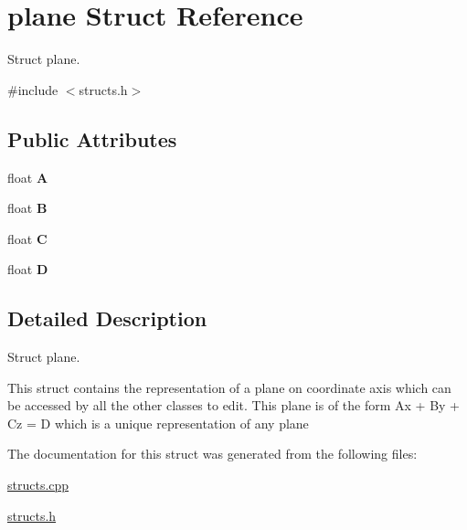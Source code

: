 \hypertarget{structplane}{}\section{plane Struct Reference}
\label{structplane}


Struct plane.  




{\ttfamily \#include $<$structs.\+h$>$}

\subsection*{Public Attributes}
\begin{DoxyCompactItemize}
\item 
float {\bfseries A}\hypertarget{structplane_a7cbe59df743ed3cf5b914b94e5d8ae52}{}\label{structplane_a7cbe59df743ed3cf5b914b94e5d8ae52}

\item 
float {\bfseries B}\hypertarget{structplane_a03abeea8dacf60d86309aa336269906f}{}\label{structplane_a03abeea8dacf60d86309aa336269906f}

\item 
float {\bfseries C}\hypertarget{structplane_a88b564304a3acb0f68186e2ea71a0cdc}{}\label{structplane_a88b564304a3acb0f68186e2ea71a0cdc}

\item 
float {\bfseries D}\hypertarget{structplane_a3c9cd28e6ff7feccc4deee7678d9f8f9}{}\label{structplane_a3c9cd28e6ff7feccc4deee7678d9f8f9}

\end{DoxyCompactItemize}


\subsection{Detailed Description}
Struct plane. 

This struct contains the representation of a plane on coordinate axis which can be accessed by all the other classes to edit. This plane is of the form Ax + By + Cz = D which is a unique representation of any plane 

The documentation for this struct was generated from the following files\+:\begin{DoxyCompactItemize}
\item 
\hyperlink{structs_8cpp}{structs.\+cpp}\item 
\hyperlink{structs_8h}{structs.\+h}\end{DoxyCompactItemize}
